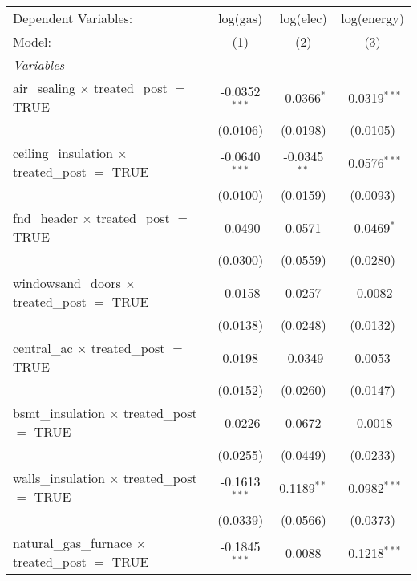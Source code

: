 \begin{tabular}{lccc}
   \tabularnewline\midrule\midrule
   Dependent Variables:                                      & log(gas)        & log(elec)      & log(energy)\\
   Model:                                                    & (1)             & (2)            & (3)\\
   \midrule \emph{Variables} &   &   &  \\
   air\_sealing $\times$ treated\_post $=$ TRUE           & -0.0352$^{***}$ & -0.0366$^{*}$  & -0.0319$^{***}$\\
                                                             & (0.0106)        & (0.0198)       & (0.0105)\\
   ceiling\_insulation $\times$ treated\_post $=$ TRUE    & -0.0640$^{***}$ & -0.0345$^{**}$ & -0.0576$^{***}$\\
                                                             & (0.0100)        & (0.0159)       & (0.0093)\\
   fnd\_header $\times$ treated\_post $=$ TRUE            & -0.0490         & 0.0571         & -0.0469$^{*}$\\
                                                             & (0.0300)        & (0.0559)       & (0.0280)\\
   windowsand\_doors $\times$ treated\_post $=$ TRUE      & -0.0158         & 0.0257         & -0.0082\\
                                                             & (0.0138)        & (0.0248)       & (0.0132)\\
   central\_ac $\times$ treated\_post $=$ TRUE            & 0.0198          & -0.0349        & 0.0053\\
                                                             & (0.0152)        & (0.0260)       & (0.0147)\\
   bsmt\_insulation $\times$ treated\_post $=$ TRUE       & -0.0226         & 0.0672         & -0.0018\\
                                                             & (0.0255)        & (0.0449)       & (0.0233)\\
   walls\_insulation $\times$ treated\_post $=$ TRUE      & -0.1613$^{***}$ & 0.1189$^{**}$  & -0.0982$^{***}$\\
                                                             & (0.0339)        & (0.0566)       & (0.0373)\\
   natural\_gas\_furnace $\times$ treated\_post $=$ TRUE & -0.1845$^{***}$ & 0.0088         & -0.1218$^{***}$\\

\end{tabular}
